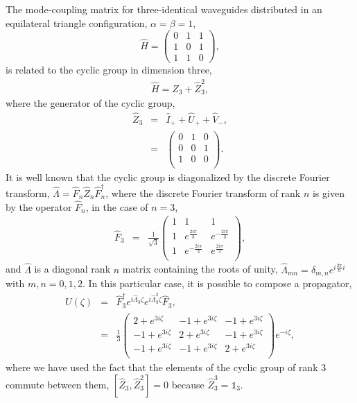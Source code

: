 \documentclass[9pt,twocolumn,twoside]{osajnl}
\begin{document}
The mode-coupling matrix for three-identical waveguides distributed in an equilateral triangle configuration, $\alpha = \beta = 1$, 
\begin{equation}
\hat{H}=\left( \begin{array}{ccc}
0 & 1 & 1 \\
1 & 0 & 1 \\
1 & 1 & 0 \end{array} \right),	 
\end{equation}
is related to the cyclic group in dimension three, 
\begin{eqnarray}
\hat{H} =  \hat{Z}_{3} + \hat{Z}_{3}^{2} ,
\end{eqnarray}
where the generator of the cyclic group, 
\begin{eqnarray}
\hat{Z}_{3} &=& \hat{I}_{+} + \hat{U}_{+} + \hat{V}_{-}, \nonumber \\
&=&\left(
\begin{array}{ccc}
 0 & 1 & 0 \\
 0 & 0 & 1 \\
 1 & 0 & 0 \\
\end{array}\right).
\end{eqnarray}
It is well known that the cyclic group is diagonalized by the discrete Fourier transform, $\hat{\Lambda} = \hat{F}_{n} \hat{Z}_{n} \hat{F}_{n}^{\dagger}$, where the discrete Fourier transform of rank $n$ is given by the operator $\hat{F}_{n}$,  in the case of $n=3$,
\begin{eqnarray}
\hat{F}_{3} &=& 
\frac{1}{\sqrt{3}}
\left(
\begin{array}{ccc}
 1 & 1 & 1 \\
 1 & e^{\frac{2 i \pi}{3}} & e^{-\frac{2 i \pi}{3}} \\
 1 & e^{-\frac{2 i \pi}{3}} & e^{\frac{2 i \pi}{3}} \\
\end{array}\right),
\end{eqnarray}
and $\hat{\Lambda}$ is a diagonal rank $n$ matrix containing the roots of unity, $\hat{\Lambda}_{mn} = \delta_{m,n} e^{ i \frac{2 \pi}{n} i}$ with $m,n = 0,1,2$.
In this particular case, it is possible to compose a propagator,
\begin{eqnarray}
U(\zeta) &=& \hat{F}_{3}^{\dagger} e^{i \hat{\Lambda}_{3} \zeta} e^{i \hat{\Lambda}_{3}^{2} \zeta} \hat{F}_{3}, \nonumber \\
&=& \frac{1}{3}\left(
\begin{array}{ccc}
 2+e^{3 i \zeta} & -1+e^{3 i \zeta} & -1+e^{3 i \zeta} \\
 -1+e^{3 i \zeta} & 2+e^{3 i \zeta} & -1+e^{3 i \zeta} \\
 -1+e^{3 i \zeta} & -1+e^{3 i \zeta} & 2+e^{3 i \zeta} \\
\end{array}
\right) e^{-i \zeta},
\end{eqnarray}
where we have used the fact that the elements of the cyclic group of rank $3$ commute between them, $\left[ \hat{Z}_{3} , \hat{Z}_{3}^{2} \right] = 0$ because $\hat{Z}_{3}^{3} = \mathbb{1}_{3}$.  
\end{document}
